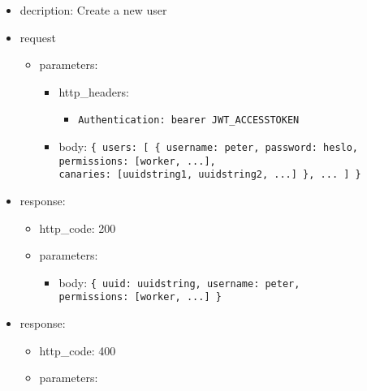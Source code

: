 \documentclass[
]{article}
\begin{document}
\begin{itemize}
\item
  decription: Create a new user
\item
  request

  \begin{itemize}
  \item
    parameters:

    \begin{itemize}
    \item
      http\_headers:

      \begin{itemize}
      \item
        \texttt{Authentication:\ \textquotesingle{}bearer\ JWT\_ACCESSTOKEN\textquotesingle{}}
      \end{itemize}
    \item
      body: \texttt{\{
      \textquotesingle{}users\textquotesingle{}:\ {[}
      	\{
      		\textquotesingle{}username\textquotesingle{}:\ \textquotesingle{}peter\textquotesingle{},
      		\textquotesingle{}password\textquotesingle{}:\ \textquotesingle{}heslo\textquotesingle{},
      		\textquotesingle{}permissions\textquotesingle{}:\ {[}\textquotesingle{}worker\textquotesingle{},\ ...{]},
      		\textquotesingle{}canaries\textquotesingle{}:\ {[}\textquotesingle{}uuidstring1\textquotesingle{},\ \textquotesingle{}uuidstring2\textquotesingle{},\ ...{]}
      	\},
      	...
      {]}
      \}}
    \end{itemize}
  \end{itemize}
\item
  response:

  \begin{itemize}
  \item
    http\_code: 200
  \item
    parameters:

    \begin{itemize}
    \item
      body: \texttt{\{
      \textquotesingle{}uuid\textquotesingle{}:\ \textquotesingle{}uuidstring\textquotesingle{},
      \textquotesingle{}username\textquotesingle{}:\ \textquotesingle{}peter\textquotesingle{},
      \textquotesingle{}permissions\textquotesingle{}:\ {[}\textquotesingle{}worker\textquotesingle{},\ ...{]}
      \}}
    \end{itemize}
  \end{itemize}
\item
  response:

  \begin{itemize}
  \item
    http\_code: 400
  \item
    parameters:


\end{itemize}
\end{itemize}
\end{document}
